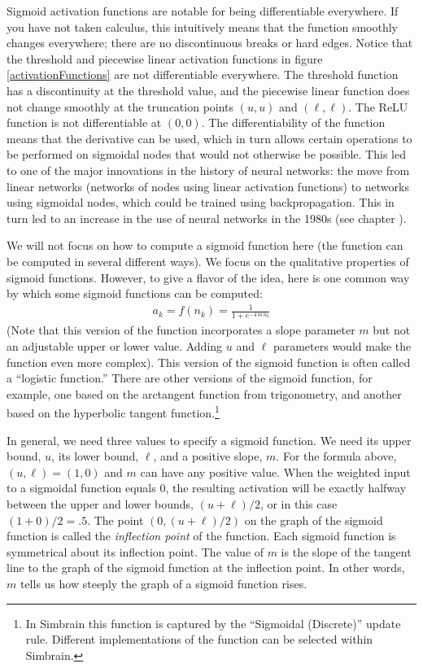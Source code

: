 Sigmoid activation functions are notable for being differentiable everywhere. If you have not taken calculus, this intuitively means that the function smoothly changes everywhere; there are no discontinuous breaks or hard edges. Notice that the threshold and piecewise linear activation functions in figure \ref{activationFunctions} are not differentiable everywhere. The threshold function has a discontinuity at the threshold value, and the piecewise linear function does not change smoothly at the truncation points $(u,u)$ and $(\ell,\ell)$. The ReLU function is not differentiable at $(0,0)$. The differentiability of the function means that the derivative can be used, which in turn allows certain operations to be performed on sigmoidal nodes that would not otherwise be possible. This led to one of the major innovations in the history of neural networks: the move from linear networks (networks of nodes using linear activation functions) to networks using sigmoidal nodes, which could be trained using backpropagation. This in turn led to an increase in the use of neural networks in the 1980s (see chapter ).

   We will not focus on how to compute a sigmoid function here (the function can be computed in several different ways). We focus on
the qualitative properties of sigmoid functions. However, to give a flavor of
the idea, here is one common way by which some sigmoid functions can be
computed:
\begin{eqnarray*}
a_k = f(n_k) = \frac{1}{1+e^{-4\, m\, n_k}}
\end{eqnarray*}
(Note that this version of the function incorporates a slope parameter $m$ but not an adjustable upper or lower value. Adding $u$ and $\ell$ parameters would make the function even more complex). This version of the sigmoid function is often called a ``logistic function.''  There are other versions of the sigmoid function, for example, one based on the arctangent function from trigonometry, and another based on the hyperbolic tangent function.\footnote{In Simbrain this function is captured by the ``Sigmoidal (Discrete)'' update rule. Different implementations of the function can be selected within Simbrain.}

In general, we need three values to specify a sigmoid function. We
need its upper bound, $u$, its lower bound, $\ell$, and a positive slope, $m$.
For the formula above, $(u,\ell) = (1,0)$ and $m$ can have any positive value.
When the weighted input to a sigmoidal function equals $0$, the resulting activation will be exactly halfway
between the upper and lower bounds, \ie $(u + \ell)/2$, or in this case $(1+0)/2 = .5$.
The point $(0,  (u + \ell)/2)$ on the graph of the sigmoid function is called the {\em
inflection point} of the function. Each sigmoid function is symmetrical about
its inflection point. The value of $m$ is the slope of the tangent line to the
graph of the sigmoid function at the inflection point. In other words, $m$
tells us how steeply the graph of a sigmoid function rises.

